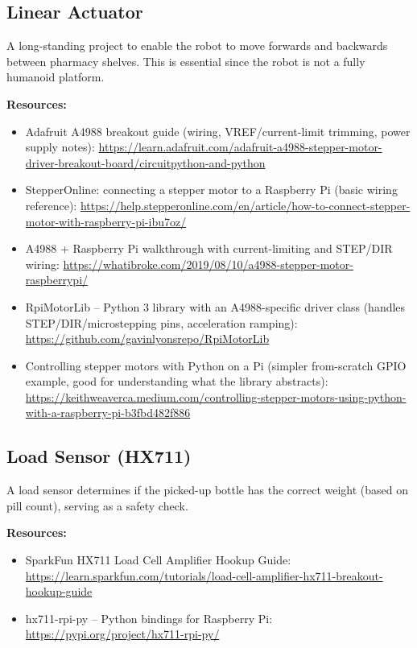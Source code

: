 \documentclass[11pt]{article}
\begin{document}
\subsection{Linear Actuator}
A long-standing project to enable the robot to move forwards and backwards between pharmacy shelves. This is essential since the robot is not a fully humanoid platform.

\textbf{Resources:}
\begin{itemize}[nosep]
    \item Adafruit A4988 breakout guide (wiring, VREF/current-limit trimming, power supply notes): \url{https://learn.adafruit.com/adafruit-a4988-stepper-motor-driver-breakout-board/circuitpython-and-python}
    \item StepperOnline: connecting a stepper motor to a Raspberry Pi (basic wiring reference): \url{https://help.stepperonline.com/en/article/how-to-connect-stepper-motor-with-raspberry-pi-ibu7oz/}
    \item A4988 + Raspberry Pi walkthrough with current-limiting and STEP/DIR wiring: \url{https://whatibroke.com/2019/08/10/a4988-stepper-motor-raspberrypi/}
    \item RpiMotorLib -- Python 3 library with an A4988-specific driver class (handles STEP/DIR/microstepping pins, acceleration ramping): \url{https://github.com/gavinlyonsrepo/RpiMotorLib}
    \item Controlling stepper motors with Python on a Pi (simpler from-scratch GPIO example, good for understanding what the library abstracts): \url{https://keithweaverca.medium.com/controlling-stepper-motors-using-python-with-a-raspberry-pi-b3fbd482f886}
\end{itemize}

\subsection{Load Sensor (HX711)}
A load sensor determines if the picked-up bottle has the correct weight (based on pill count), serving as a safety check.

\textbf{Resources:}
\begin{itemize}[nosep]
    \item SparkFun HX711 Load Cell Amplifier Hookup Guide: \url{https://learn.sparkfun.com/tutorials/load-cell-amplifier-hx711-breakout-hookup-guide}
    \item hx711-rpi-py -- Python bindings for Raspberry Pi: \url{https://pypi.org/project/hx711-rpi-py/}
\end{itemize}
\end{document}
